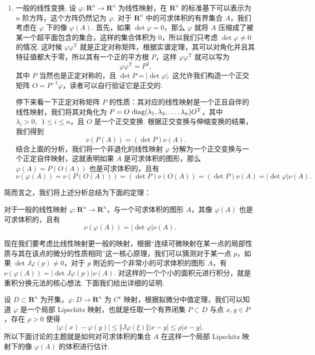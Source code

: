 \begin{enumerate}[label=(\arabic*)]
    \item 一般的线性变换. 设 $\varphi\colon \mathbf{R}^n\to \mathbf{R}^n$ 为线性映射，在 $\mathbf{R}^n$ 的标准基下可以表示为 $n$ 阶方阵，这个方阵仍然记为 $\varphi$. 对于 $\mathbf{R}^n$ 中的可求体积的有界集合 $A$，我们考虑在 $\varphi$ 下的像 $\varphi(A)$. 首先，如果 $\det\varphi = 0$，那么 $\varphi$ 就将 $A$ 压缩成了被某一个超平面包含的集合，这样的集合体积为 $0$，所以我们只考虑 $\det\varphi\neq 0$ 的情况. 这时候 $\varphi\varphi^\mathrm{T}$ 就是正定对称矩阵，根据实谱定理，其可以对角化并且其特征值都大于零，所以其有一个正的平方根 $P$，这样 $\varphi\varphi^\mathrm{T}$ 就可以写为 \[\varphi\varphi^\mathrm{T} = P^2,\]
          其中 $P$ 当然也是正定对称的，且 $\det P = \lvert\det\varphi\rvert$. 这允许我们构造一个正交矩阵 $O = P^{-1}\varphi$，读者可以自行验证它是正交的.

          停下来看一下正定对称矩阵 $P$ 的性质：其对应的线性映射是一个正且自伴的线性映射，我们将其对角化为 $P = O\,\operatorname{diag}(\lambda_1, \lambda_2, \ldots, \lambda_n) O^\mathrm{T}$，其中 $\lambda_i > 0,\enspace 1\leqslant i\leqslant n$，且 $O$ 是一个正交变换. 根据正交变换与伸缩变换的结果，我们得到 \[\nu(P(A)) = (\det P)\nu(A).\]
          结合上面的分析，我们将一个非退化的线性映射 $\varphi$ 分解为一个正交变换与一个正定自伴映射，这就表明如果 $A$ 是可求体积的图形，那么 $\varphi(A) = P(O(A))$ 也是可求体积的，且有 \[\nu(\varphi(A)) = \nu(P(O(A))) = (\det P)\nu(O(A)) = (\det P)\nu(A) = \lvert\det\varphi\rvert \nu(A).\]
\end{enumerate}
简而言之，我们将上述分析总结为下面的定理：

\begin{theorem}{}{}
    对于一般的线性映射 $\varphi\colon \mathbf{R}^n\to \mathbf{R}^n$，与一个可求体积的图形 $A$，其像 $\varphi(A)$ 也是可求体积的，且有 \[\nu(\varphi(A)) = \lvert\det\varphi\rvert \nu(A).\]
\end{theorem}

现在我们要考虑比线性映射更一般的映射，根据``连续可微映射在某一点的局部性质与其在该点的微分的性质相同''这一核心原理，我们可以猜测对于某一点 $p$，如果 $\det J\varphi(p)\neq 0$，对于 $p$ 附近的一个非常小的可求体积的图形 $A$，有 $\nu(\varphi(A)) = \lvert\det J\varphi(p)\rvert \nu(A)$. 对这样的一个个小的面积元进行积分，就是重积分换元法的核心想法. 下面我们给出详细的证明.

设 $D\subset \mathbf{R}^n$ 为开集，$\varphi\colon D\to \mathbf{R}^n$ 为 $C^1$ 映射，根据拟微分中值定理，我们可以知道 $\varphi$ 是一个局部 Lipschitz 映射，也就是任取一个有界闭集 $P\subset D$ 与点 $x, y\in P$，存在 $\rho > 0$ 使得 \[\vert \varphi(x) - \varphi(y)\vert \leqslant \Vert J\varphi(\xi)\Vert \vert x - y\vert \leqslant \rho \vert x - y\vert.\]
所以下面讨论的主题就是如何对可求体积的集合 $A$ 在这样一个局部 Lipschitz 映射下的像 $\varphi(A)$ 的体积进行估计.

